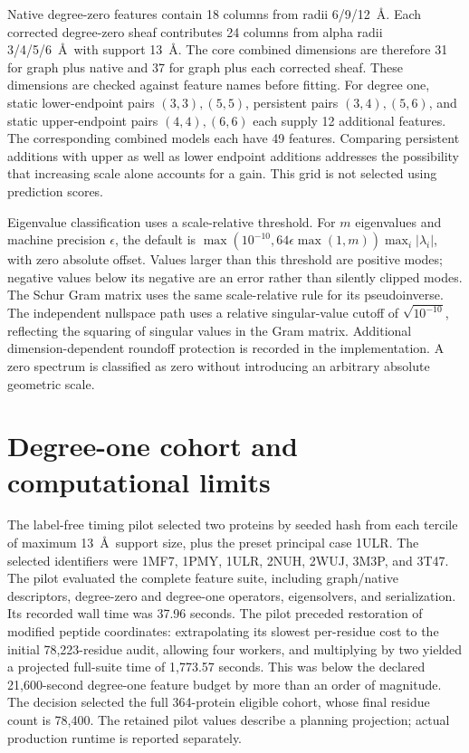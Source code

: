 \documentclass[10pt]{article}
\begin{document}
Native degree-zero features contain 18 columns from radii 6/9/12~\AA. Each corrected degree-zero sheaf contributes 24 columns from alpha radii 3/4/5/6~\AA\ with support 13~\AA. The core combined dimensions are therefore 31 for graph plus native and 37 for graph plus each corrected sheaf. These dimensions are checked against feature names before fitting. For degree one, static lower-endpoint pairs $(3,3),(5,5)$, persistent pairs $(3,4),(5,6)$, and static upper-endpoint pairs $(4,4),(6,6)$ each supply 12 additional features. The corresponding combined models each have 49 features. Comparing persistent additions with upper as well as lower endpoint additions addresses the possibility that increasing scale alone accounts for a gain. This grid is not selected using prediction scores.

Eigenvalue classification uses a scale-relative threshold. For $m$ eigenvalues and machine precision $\epsilon$, the default is $\max(10^{-10},64\epsilon\max(1,m))\max_i|\lambda_i|$, with zero absolute offset. Values larger than this threshold are positive modes; negative values below its negative are an error rather than silently clipped modes. The Schur Gram matrix uses the same scale-relative rule for its pseudoinverse. The independent nullspace path uses a relative singular-value cutoff of $\sqrt{10^{-10}}$, reflecting the squaring of singular values in the Gram matrix. Additional dimension-dependent roundoff protection is recorded in the implementation. A zero spectrum is classified as zero without introducing an arbitrary absolute geometric scale.

\section{Degree-one cohort and computational limits}
The label-free timing pilot selected two proteins by seeded hash from each tercile of maximum 13~\AA\ support size, plus the preset principal case 1ULR. The selected identifiers were 1MF7, 1PMY, 1ULR, 2NUH, 2WUJ, 3M3P, and 3T47. The pilot evaluated the complete feature suite, including graph/native descriptors, degree-zero and degree-one operators, eigensolvers, and serialization. Its recorded wall time was 37.96 seconds. The pilot preceded restoration of modified peptide coordinates: extrapolating its slowest per-residue cost to the initial 78,223-residue audit, allowing four workers, and multiplying by two yielded a projected full-suite time of 1,773.57 seconds. This was below the declared 21,600-second degree-one feature budget by more than an order of magnitude. The decision selected the full 364-protein eligible cohort, whose final residue count is 78,400. The retained pilot values describe a planning projection; actual production runtime is reported separately.
\end{document}
